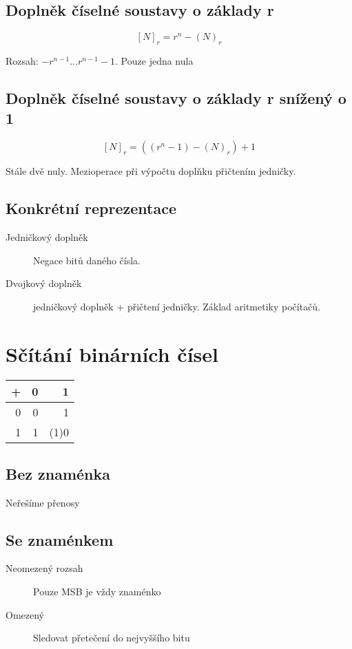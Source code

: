 \documentclass[a4paper, 11pt]{report}
\begin{document}
\subsection{Doplněk číselné soustavy o základy r}

$$ [N]_r = r^n - (N)_r $$

Rozsah: $ -r^{n-1} \dots r^{n-1} - 1 $. Pouze jedna nula

\subsection{Doplněk číselné soustavy o základy r snížený o 1}

$$ [N]_r = ((r^n -1) - (N)_r)+1$$

Stále dvě nuly. Mezioperace při výpočtu doplňku přičtením jedničky.

\subsection{Konkrétní reprezentace}
\begin{description}
	\item[Jedničkový doplněk] Negace bitů daného čísla.
	\item[Dvojkový doplněk] jedničkový doplněk + přičtení jedničky. Základ aritmetiky počítačů.
\end{description}

\section{Sčítání binárních čísel}

\begin{tabular}{ r | r r}
	+ & 0 & 1 \\ \hline
	0 & 0 & 1 \\
	1 & 1 & (1)0 \\
\end{tabular}

\subsection{Bez znaménka}

Neřešíme přenosy

\subsection{Se znaménkem}

\begin{description}
	\item[Neomezený rozsah] Pouze MSB je vždy znaménko
	\item[Omezený]	Sledovat přetečení do nejvyššího bitu
\end{description}
\end{document}
